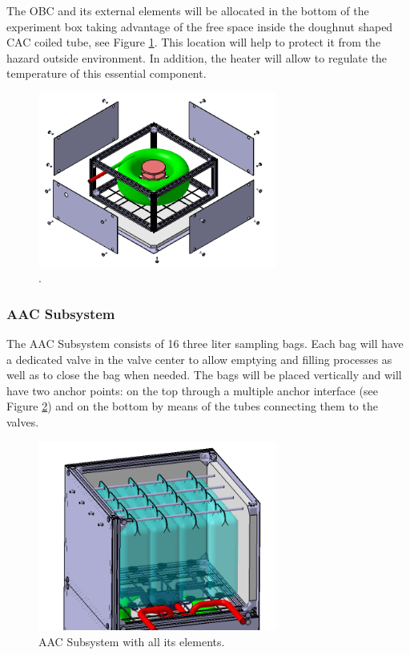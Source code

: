 The OBC and its external elements will be allocated in the bottom of the experiment box taking advantage of the free space inside the doughnut shaped CAC coiled tube, see Figure \ref{electronics_box}. This location will help to protect it from the hazard outside environment. In addition, the heater will allow to regulate the temperature of this essential component.


\begin{figure}[!ht]
    \centering
    \includegraphics[width=0.7\textwidth]{4-experiment-design/img/explos_CAC.jpg}
    \caption{.}
    \label{electronics_box}
\end{figure}

\pagebreak
\subsubsection{AAC Subsystem}

The AAC Subsystem consists of 16 three liter sampling bags. Each bag will have a dedicated valve in the valve center to allow emptying and filling processes as well as to close the bag when needed. The bags will be placed vertically and will have two anchor points: on the top through a  multiple anchor interface (see Figure \ref{anchor_bags}) and on the bottom by means of the tubes connecting them to the valves.


\begin{figure}[!ht]
    \centering
    \includegraphics[width=0.7\textwidth]{4-experiment-design/img/anchored_bags.jpg}
    \caption{AAC Subsystem with all its elements.}
    \label{anchor_bags}
\end{figure}


